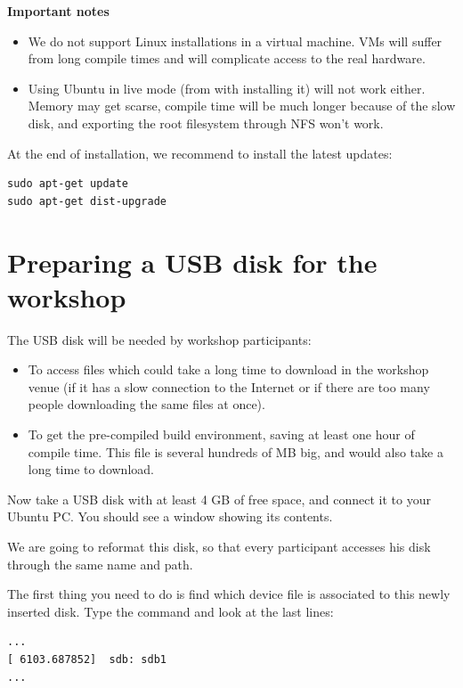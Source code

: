 {\bf Important notes}
\begin{itemize}
\item We do not support Linux installations in a virtual machine.
      VMs will suffer from long compile times and will complicate
      access to the real hardware.
\item Using Ubuntu in live mode (from with installing it) will not work
      either.  Memory may get scarse, compile time will be much longer because
      of the slow disk, and exporting the root filesystem through NFS
      won't work.
\end{itemize}

At the end of installation, we recommend to install the latest updates:

\begin{verbatim}
sudo apt-get update
sudo apt-get dist-upgrade
\end{verbatim}

\section{Preparing a USB disk for the workshop}

The USB disk will be needed by workshop participants:

\begin{itemize}
\item To access files which could take a long time to download
      in the workshop venue (if it has a slow connection to the Internet
      or if there are too many people downloading the same files at
      once).
\item To get the pre-compiled build environment, saving at least
      one hour of compile time. This file is several hundreds of MB big,
      and would also take a long time to download.
\end{itemize}

Now take a USB disk with at least 4 GB of free space, and connect it
to your Ubuntu PC. You should see a window showing its contents.

We are going to reformat this disk, so that every participant
accesses his disk through the same name and path.

The first thing you need to do is find which device file is
associated to this newly inserted disk. Type the  command
and look at the last lines:

\begin{verbatim}
...
[ 6103.687852]  sdb: sdb1
...
\end{verbatim}

